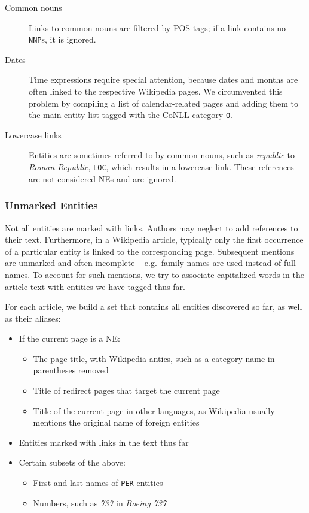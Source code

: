 \documentclass[11pt]{article}
\begin{document}
\begin{description}
\item[Common nouns] Links to common nouns are filtered by POS tags; if a link contains no \texttt{NNP}s, it is ignored.
\item[Dates] Time expressions require special attention, because dates and months are often linked to the respective Wikipedia pages. We circumvented this problem by compiling a list of calendar-related pages and adding them to the main entity list tagged with the CoNLL category \texttt{O}. 
\item[Lowercase links] Entities are sometimes referred to by common nouns, such as \textit{republic} to \textit{Roman Republic}, \texttt{LOC}, which results in a lowercase link. These references are not considered NEs and are ignored.
\end{description}

\subsubsection{Unmarked Entities}

Not all entities are marked with links. Authors may neglect to add references to their text. Furthermore, in a Wikipedia article, typically only the first occurrence of a particular entity is linked to the corresponding page. Subsequent mentions are unmarked and often incomplete -- e.g.~family names are used instead of full names. To account for such mentions, we try to associate capitalized words in the article text with entities we have tagged thus far.

For each article, we build a set that contains all entities discovered so far, as well as their aliases:
\begin{itemize}
\item If the current page is a NE:
  \begin{itemize}
  \item The page title, with Wikipedia antics, such as a category name in parentheses removed
  \item Title of redirect pages that target the current page
  \item Title of the current page in other languages, as Wikipedia usually mentions the original name of foreign entities
  \end{itemize}
\item Entities marked with links in the text thus far
\item Certain subsets of the above:
  \begin{itemize}
  \item First and last names of \texttt{PER} entities
  \item Numbers, such as \textit{737} in \textit{Boeing 737}
  \end{itemize}
\end{itemize}
\end{document}
